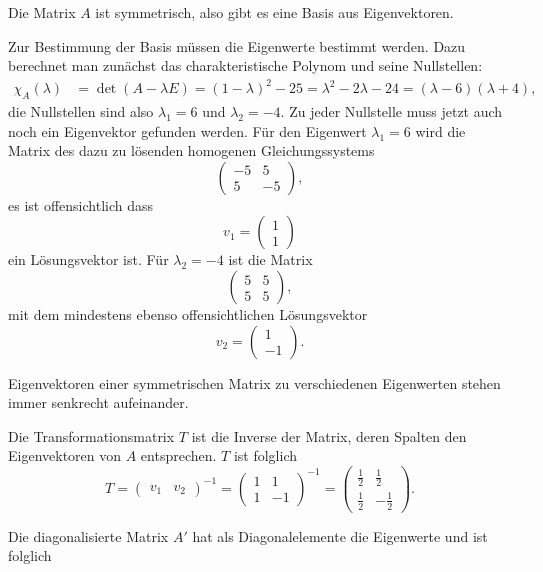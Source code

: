 \begin{loesung}
\begin{teilaufgaben}
\item
Die Matrix $A$ ist symmetrisch, also gibt es eine Basis aus
Eigenvektoren.
\item
Zur Bestimmung der Basis müssen die Eigenwerte bestimmt werden.
Dazu berechnet man zunächst das charakteristische Polynom und
seine Nullstellen:
\begin{align*}
\chi_A(\lambda)
&=\det(A-\lambda E)=(1-\lambda)^2-25=\lambda^2-2\lambda -24
=(\lambda-6)(\lambda +4),
\end{align*}
die Nullstellen sind also $\lambda_1=6$ und $\lambda_2=-4$. Zu jeder
Nullstelle muss jetzt auch noch ein Eigenvektor gefunden werden.
Für den Eigenwert $\lambda_1=6$ wird die Matrix des dazu zu lösenden
homogenen Gleichungssystems
\[
\begin{pmatrix}-5&5\\5&-5\end{pmatrix},
\]
es ist offensichtlich dass
\[
v_1=\begin{pmatrix}1\\1\end{pmatrix}
\]
ein Lösungsvektor ist. Für $\lambda_2=-4$ ist die Matrix
\[
\begin{pmatrix}5&5\\5&5\end{pmatrix},
\]
mit dem mindestens ebenso offensichtlichen Lösungsvektor
\[
v_2=\begin{pmatrix}1\\-1\end{pmatrix}.
\]
\item
Eigenvektoren einer symmetrischen Matrix zu verschiedenen Eigenwerten
stehen immer senkrecht aufeinander.
\item Die Transformationsmatrix $T$ ist die Inverse der Matrix, deren Spalten den Eigenvektoren von $A$ entsprechen. $T$ ist folglich
\[
    T = \begin{pmatrix}v_1 & v_2 \end{pmatrix}^{-1} = \begin{pmatrix}1 & 1\\ 1 & -1 \end{pmatrix}^{-1} = \begin{pmatrix}\frac{1}{2} & \frac{1}{2}\\ \frac{1}{2} & -\frac{1}{2} \end{pmatrix}.
\]
\item Die diagonalisierte Matrix $A'$ hat als Diagonalelemente die Eigenwerte und ist folglich

\end{teilaufgaben}
\end{loesung}
